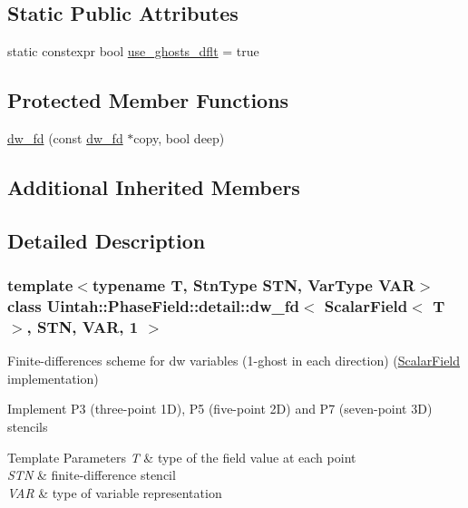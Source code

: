 \subsection*{Static Public Attributes}
\begin{DoxyCompactItemize}
\item 
static constexpr bool \hyperlink{classUintah_1_1PhaseField_1_1detail_1_1dw__fd_3_01ScalarField_3_01T_01_4_00_01STN_00_01VAR_00_011_01_4_a052f491aac43151f67e123d0bf79ea96}{use\+\_\+ghosts\+\_\+dflt} = true
\end{DoxyCompactItemize}
\subsection*{Protected Member Functions}
\begin{DoxyCompactItemize}
\item 
\hyperlink{classUintah_1_1PhaseField_1_1detail_1_1dw__fd_3_01ScalarField_3_01T_01_4_00_01STN_00_01VAR_00_011_01_4_ac2909219cca3685d3ec27405135b72a1}{dw\+\_\+fd} (const \hyperlink{classUintah_1_1PhaseField_1_1detail_1_1dw__fd}{dw\+\_\+fd} $\ast$copy, bool deep)
\end{DoxyCompactItemize}
\subsection*{Additional Inherited Members}


\subsection{Detailed Description}
\subsubsection*{template$<$typename T, Stn\+Type S\+TN, Var\+Type V\+AR$>$\newline
class Uintah\+::\+Phase\+Field\+::detail\+::dw\+\_\+fd$<$ Scalar\+Field$<$ T $>$, S\+T\+N, V\+A\+R, 1 $>$}

Finite-\/differences scheme for dw variables (1-\/ghost in each direction) (\hyperlink{structUintah_1_1PhaseField_1_1ScalarField}{Scalar\+Field} implementation) 

Implement P3 (three-\/point 1D), P5 (five-\/point 2D) and P7 (seven-\/point 3D) stencils


\begin{DoxyTemplParams}{Template Parameters}
{\em T} & type of the field value at each point \\
\hline
{\em S\+TN} & finite-\/difference stencil \\
\hline
{\em V\+AR} & type of variable representation \\
\hline
\end{DoxyTemplParams}


